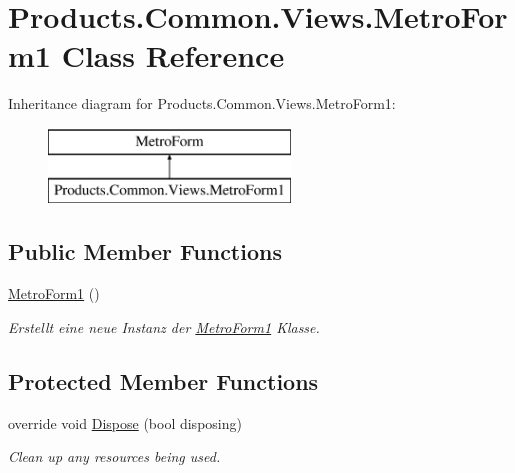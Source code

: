 \hypertarget{class_products_1_1_common_1_1_views_1_1_metro_form1}{}\section{Products.\+Common.\+Views.\+Metro\+Form1 Class Reference}
\label{class_products_1_1_common_1_1_views_1_1_metro_form1}
Inheritance diagram for Products.\+Common.\+Views.\+Metro\+Form1\+:\begin{figure}[H]
\begin{center}
\leavevmode
\includegraphics[height=2.000000cm]{class_products_1_1_common_1_1_views_1_1_metro_form1}
\end{center}
\end{figure}
\subsection*{Public Member Functions}
\begin{DoxyCompactItemize}
\item 
\hyperlink{class_products_1_1_common_1_1_views_1_1_metro_form1_a554ba87edb3870256b344cdeac25fcb7}{Metro\+Form1} ()
\begin{DoxyCompactList}\small\item\em Erstellt eine neue Instanz der \hyperlink{class_products_1_1_common_1_1_views_1_1_metro_form1}{Metro\+Form1} Klasse. \end{DoxyCompactList}\end{DoxyCompactItemize}
\subsection*{Protected Member Functions}
\begin{DoxyCompactItemize}
\item 
override void \hyperlink{class_products_1_1_common_1_1_views_1_1_metro_form1_a1240a335564d33fc70e8bcc493d7c180}{Dispose} (bool disposing)
\begin{DoxyCompactList}\small\item\em Clean up any resources being used. \end{DoxyCompactList}\end{DoxyCompactItemize}


